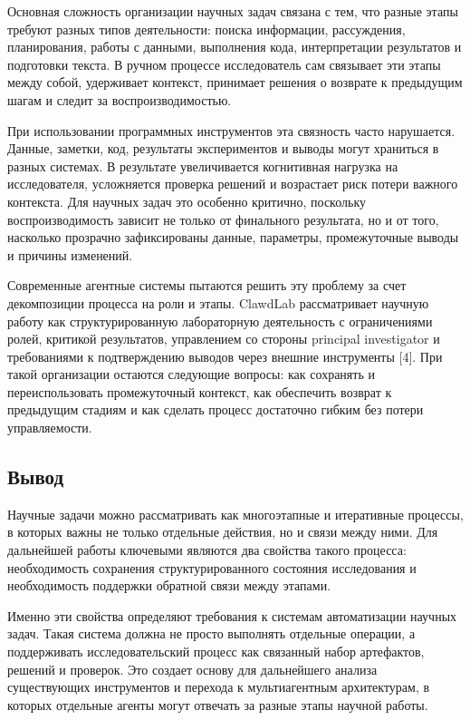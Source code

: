 Основная сложность организации научных задач связана с тем, что разные этапы требуют разных типов деятельности: поиска информации, рассуждения, планирования, работы с данными, выполнения кода, интерпретации результатов и подготовки текста. В ручном процессе исследователь сам связывает эти этапы между собой, удерживает контекст, принимает решения о возврате к предыдущим шагам и следит за воспроизводимостью.

При использовании программных инструментов эта связность часто нарушается. Данные, заметки, код, результаты экспериментов и выводы могут храниться в разных системах. В результате увеличивается когнитивная нагрузка на исследователя, усложняется проверка решений и возрастает риск потери важного контекста. Для научных задач это особенно критично, поскольку воспроизводимость зависит не только от финального результата, но и от того, насколько прозрачно зафиксированы данные, параметры, промежуточные выводы и причины изменений.

Современные агентные системы пытаются решить эту проблему за счет декомпозиции процесса на роли и этапы. ClawdLab рассматривает научную работу как структурированную лабораторную деятельность с ограничениями ролей, критикой результатов, управлением со стороны principal investigator и требованиями к подтверждению выводов через внешние инструменты [4]. При такой организации остаются следующие вопросы: как сохранять и переиспользовать промежуточный контекст, как обеспечить возврат к предыдущим стадиям и как сделать процесс достаточно гибким без потери управляемости.

\subsection{Вывод}

Научные задачи можно рассматривать как многоэтапные и итеративные процессы, в которых важны не только отдельные действия, но и связи между ними. Для дальнейшей работы ключевыми являются два свойства такого процесса: необходимость сохранения структурированного состояния исследования и необходимость поддержки обратной связи между этапами.

Именно эти свойства определяют требования к системам автоматизации научных задач. Такая система должна не просто выполнять отдельные операции, а поддерживать исследовательский процесс как связанный набор артефактов, решений и проверок. Это создает основу для дальнейшего анализа существующих инструментов и перехода к мультиагентным архитектурам, в которых отдельные агенты могут отвечать за разные этапы научной работы.

